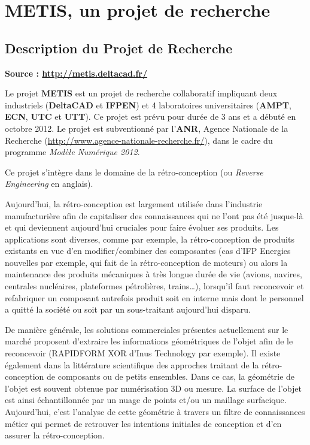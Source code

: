 \chapter{METIS, un projet de recherche}

\section{Description du Projet de Recherche}

\textbf{Source : \url{http://metis.deltacad.fr/}}

Le projet \textbf{METIS} est un projet de recherche collaboratif impliquant deux industriels (\textbf{DeltaCAD} et \textbf{IFPEN}) et 4 laboratoires universitaires (\textbf{AMPT}, \textbf{ECN}, \textbf{UTC} et \textbf{UTT}). Ce projet est prévu pour durée de 3 ans et a débuté en octobre 2012. Le projet est subventionné par l'\textbf{ANR}, Agence Nationale de la Recherche (\url{http://www.agence-nationale-recherche.fr/}), dans le cadre du programme \textit{Modèle Numérique 2012}.

Ce projet s’intègre dans le domaine de la rétro-conception (ou \textit{Reverse Engineering} en anglais).
 
Aujourd’hui, la rétro-conception est largement utilisée dans l’industrie manufacturière afin de capitaliser des connaissances qui ne l’ont pas été jusque-là et qui deviennent aujourd’hui cruciales pour faire évoluer ses produits.
Les applications sont diverses, comme par exemple, la rétro-conception de produits existants en vue d’en modifier/combiner des composantes (cas d’IFP Energies nouvelles par exemple, qui fait de la rétro-conception de moteurs) ou alors la maintenance des produits mécaniques à très longue durée de vie (avions, navires, centrales nucléaires, plateformes pétrolières, trains…), lorsqu’il faut reconcevoir et refabriquer un composant autrefois produit soit en interne mais dont le personnel a quitté la société ou soit par un sous-traitant aujourd’hui disparu.
                                
De manière générale, les solutions commerciales présentes actuellement sur le marché proposent d’extraire les informations géométriques de l’objet afin de le reconcevoir (RAPIDFORM XOR d’Inus Technology par exemple).
Il existe également dans la littérature scientifique des approches traitant de la rétro-conception de composants ou de petits ensembles. Dans ce cas, la géométrie de l’objet est souvent obtenue par numérisation 3D ou mesure. La surface de l’objet est ainsi échantillonnée par un nuage de points et/ou un maillage surfacique. Aujourd’hui, c’est l’analyse de cette géométrie à travers un filtre de connaissances métier qui permet de retrouver les intentions initiales de conception et d’en assurer la rétro-conception.
 

